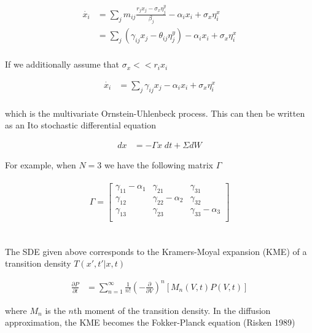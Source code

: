 \documentclass{article}
\begin{document}
\begin{align*}
\dot{x_{i}} &= \sum_{j}m_{ij}\frac{r_{j}x_{j} - \sigma_{x}\eta_{j}^{y}}{\beta_{j}} - \alpha_{i} x_{i} + \sigma_{x}\eta_{i}^{x}\\
&= \sum_{j}\left(\gamma_{ij}x_{j} - \theta_{ij}\eta_{j}^{y}\right) - \alpha_{i} x_{i} + \sigma_{x}\eta_{i}^{x}\\
\end{align*}

If we additionally assume that $\sigma_{x} << r_{i}x_{i}$

\begin{align*}
\dot{x_{i}} &= \sum_{j}\gamma_{ij}x_{j} - \alpha_{i} x_{i} + \sigma_{x}\eta_{i}^{x}\\
\end{align*}

which is the multivariate Ornstein-Uhlenbeck process. This can then be written as an Ito stochastic differential equation

\begin{align*}
dx &= -\Gamma x\; dt + \Sigma dW 
\end{align*}

For example, when $N=3$ we have the following matrix $\Gamma$
\\
\\
\begin{equation*}
\Gamma = \begin{bmatrix} 
    \gamma_{11}-\alpha_{1} & \gamma_{21} & \gamma_{31}\\
	\gamma_{12} & \gamma_{22} -\alpha_{2} & \gamma_{32}\\
	\gamma_{13} & \gamma_{23} & \gamma_{33}-\alpha_{3}\\
\end{bmatrix}
\end{equation*}
\\
\\

The SDE given above corresponds to the Kramers-Moyal expansion (KME) of a transition density $T(x',t'|x,t)$

\begin{align}
\frac{\partial P}{\partial t}  &= \sum_{n=1}^{\infty} \frac{1}{n!}\left(-\frac{\partial}{\partial V}\right)^{n} \left[M_{n}(V,t)P(V,t)\right]
\end{align}

where $M_{n}$ is the $n$th moment of the transition density. In the diffusion approximation, the KME becomes the Fokker-Planck equation (Risken 1989)
\end{document}
